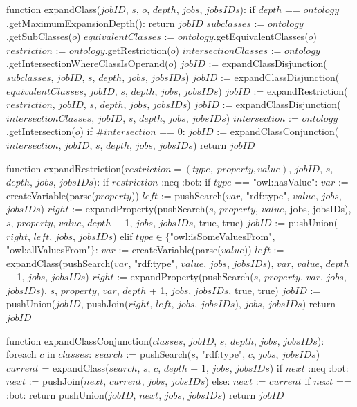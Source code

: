 function expandClass($jobID$, $s$, $o$, $depth$, $jobs$, $jobsIDs$):
    if $depth$ == $ontology$.getMaximumExpansionDepth():
        return $jobID$
    $subclasses$ := $ontology$.getSubClasses($o$)
    $equivalentClasses$ := $ontology$.getEquivalentClasses($o$)
    $restriction$ := $ontology$.getRestriction($o$)
    $intersectionClasses$ := $ontology$.getIntersectionWhereClassIsOperand($o$)
    $jobID$ := expandClassDisjunction($subclasses$, $jobID$, $s$, $depth$, $jobs$, $jobsIDs$)
    $jobID$ := expandClassDisjunction($equivalentClasses$, $jobID$, $s$, $depth$, $jobs$, $jobsIDs$)
    $jobID$ := expandRestriction($restriction$, $jobID$, $s$, $depth$, $jobs$, $jobsIDs$)
    $jobID$ := expandClassDisjunction($intersectionClasses$, $jobID$, $s$, $depth$, $jobs$, $jobsIDs$)
    $intersection$ := $ontology$.getIntersection($o$)
    if $\#intersection$ == 0:
        $jobID$ := expandClassConjunction($intersection$, $jobID$, $s$, $depth$, $jobs$, $jobsIDs$)
    return $jobID$

function expandRestriction($restriction = (type, \; property, value)$, $jobID$, $s$, $depth$, $jobs$, $jobsIDs$):   
    if $restriction$ :neq :bot:
        if $type$ == "owl:hasValue":
        $var$ := createVariable(parse($property$))
            $left$ := pushSearch($var$, "rdf:type", $value$, $jobs$, $jobsIDs$) 
            $right$ := expandProperty(pushSearch($s$, $property$, $value$, jobs, jobsIDs), $s$, $property$, $value$, $depth$ + 1, $jobs$, $jobsIDs$, true, true)
            $jobID$ := pushUnion($right$, $left$, $jobs$, $jobsIDs$)
        elif $type \in \{$"owl:isSomeValuesFrom", "owl:allValuesFrom"$\}$:
            $var$ := createVariable(parse($value$))
            $left$ := expandClass(pushSearch($var$, "rdf:type", $value$, $jobs$, $jobsIDs$), $var$, $value$, $depth$ + 1, $jobs$, $jobsIDs$)
            $right$ := expandProperty(pushSearch($s$, $property$, $var$, $jobs$, $jobsIDs$), $s$, $property$, $var$, $depth$ + 1, $jobs$, $jobsIDs$, true, true)
            $jobID$ := pushUnion($jobID$, pushJoin($right$, $left$, $jobs$, $jobsIDs$), $jobs$, $jobsIDs$)
    return $jobID$

function expandClassConjunction($classes$, $jobID$, $s$, $depth$, $jobs$, $jobsIDs$):
    foreach $c$ in $classes$:
        $search$ := pushSearch($s$, "rdf:type", $c$, $jobs$, $jobsIDs$)
        $current$ = expandClass($search$, $s$, $c$, $depth$ + 1, $jobs$, $jobsIDs$)
        if $next$ :neq :bot:
            $next$ := pushJoin($next$, $current$, $jobs$, $jobsIDs$)
        else:
            $next$ := $current$
    if $next$ == :bot:
        return pushUnion($jobID$, $next$, $jobs$, $jobsIDs$)
    return $jobID$

